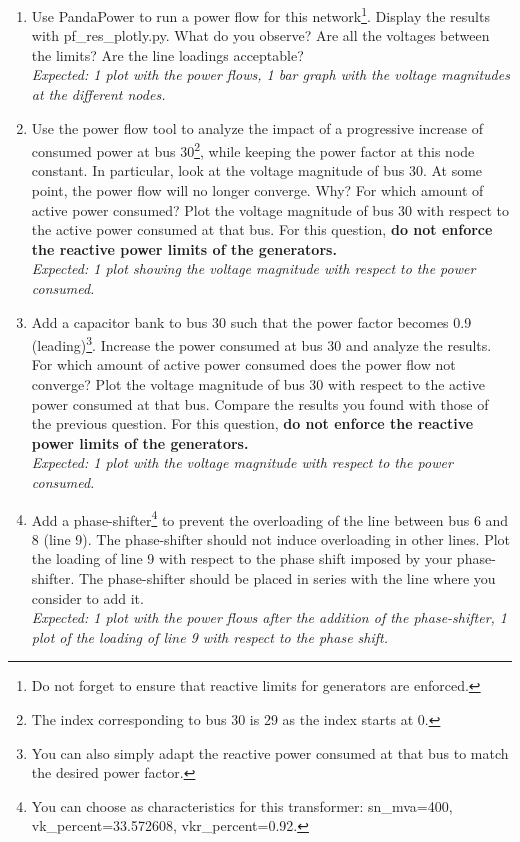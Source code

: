 \documentclass[11pt,a4paper]{article}
\begin{document}
\begin{enumerate}
    \item Use PandaPower to run a power flow for this network\footnote{Do not forget to ensure that reactive limits for generators are enforced.}. Display the results with pf\_res\_plotly.py. What do you observe? Are all the voltages between the limits? Are the line loadings acceptable?\\
    \textit{Expected: 1 plot with the power flows, 1 bar graph with the voltage magnitudes at the different nodes.}
    
    \item Use the power flow tool to analyze the impact of a progressive increase of consumed power at bus 30\footnote{The index corresponding to bus 30 is 29 as the index starts at 0.}, while keeping the power factor at this node constant. In particular, look at the voltage magnitude of bus 30. At some point, the power flow will no longer converge. Why? For which amount of active power consumed? Plot the voltage magnitude of bus 30 with respect to the active power consumed at that bus. For this question, \textbf{do not enforce the reactive power limits of the generators.}\\
    \textit{Expected: 1 plot showing the voltage magnitude with respect to the power consumed.}
    
    \item Add a capacitor bank to bus 30 such that the power factor becomes 0.9 (leading)\footnote{You can also simply adapt the reactive power consumed at that bus to match the desired power factor.}. Increase the power consumed at bus 30 and analyze the results. For which amount of active power consumed does the power flow not converge? Plot the voltage magnitude of bus 30 with respect to the active power consumed at that bus. Compare the results you found with those of the previous question. For this question, \textbf{do not enforce the reactive power limits of the generators.}\\
    \textit{Expected: 1 plot with the voltage magnitude with respect to the power consumed.}
    
    \item Add a phase-shifter\footnote{You can choose as characteristics for this transformer: sn\_mva=400, vk\_percent=33.572608, vkr\_percent=0.92.} to prevent the overloading of the line between bus 6 and 8 (line 9). The phase-shifter should not induce overloading in other lines. Plot the loading of line 9 with respect to the phase shift imposed by your phase-shifter. The phase-shifter should be placed in series with the line where you consider to add it.\\
    \textit{Expected: 1 plot with the power flows after the addition of the phase-shifter, 1 plot of the loading of line 9 with respect to the phase shift.} 
       

\end{enumerate}
\end{document}
